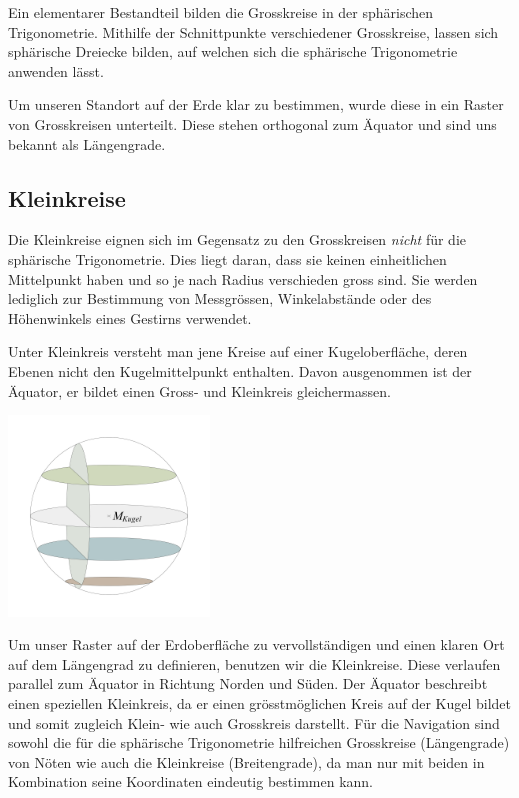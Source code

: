 \begin{refsection}
Ein elementarer Bestandteil bilden die Grosskreise in der sphärischen Trigonometrie. Mithilfe der Schnittpunkte verschiedener Grosskreise, lassen sich sphärische Dreiecke bilden, auf welchen sich die sphärische Trigonometrie anwenden lässt.

Um unseren Standort auf der Erde klar zu bestimmen, wurde diese in ein Raster von Grosskreisen unterteilt. Diese stehen orthogonal zum Äquator und sind uns bekannt als Längengrade.


\subsection{Kleinkreise}
Die Kleinkreise eignen sich im Gegensatz zu den Grosskreisen \textit{nicht} für die sphärische Trigonometrie.  Dies liegt daran, dass sie keinen einheitlichen Mittelpunkt haben und so je nach Radius verschieden gross sind.
Sie werden lediglich zur Bestimmung von Messgrössen, Winkelabstände oder des Höhenwinkels eines Gestirns verwendet. 

\begin{definition}
Unter Kleinkreis versteht man jene Kreise auf einer Kugeloberfläche, deren Ebenen nicht den Kugelmittelpunkt enthalten. Davon ausgenommen ist der Äquator, er bildet einen Gross- und Kleinkreis gleichermassen.
\label{skript:kugel:satz:Kleinkreis}
\end{definition} 

\begin{center}
        \includegraphics[width=0.4\textwidth]{kugel/Kleinkreise.jpg}
\end{center}

Um unser Raster auf der Erdoberfläche zu vervollständigen und einen klaren Ort auf dem Längengrad zu definieren, benutzen wir die Kleinkreise. Diese verlaufen parallel zum Äquator in Richtung Norden und Süden. Der Äquator beschreibt einen speziellen Kleinkreis, da er einen grösstmöglichen Kreis auf der Kugel bildet und somit zugleich Klein- wie auch Grosskreis darstellt.
Für die Navigation sind sowohl die für die sphärische Trigonometrie hilfreichen Grosskreise (Längengrade) von Nöten wie auch die Kleinkreise (Breitengrade), da man nur mit beiden in Kombination seine Koordinaten eindeutig bestimmen kann.




\end{refsection}
